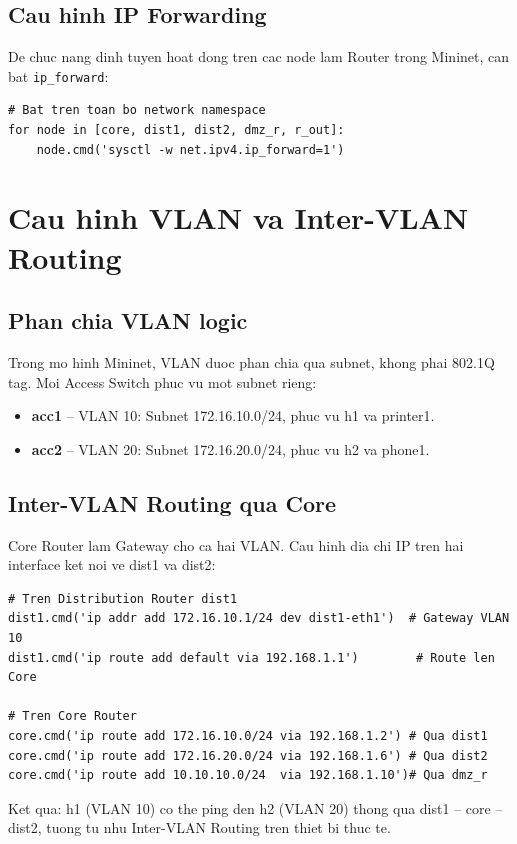 \subsection{Cau hinh IP Forwarding}

De chuc nang dinh tuyen hoat dong tren cac node lam Router trong Mininet, can bat \texttt{ip\_forward}:

\begin{lstlisting}
# Bat tren toan bo network namespace
for node in [core, dist1, dist2, dmz_r, r_out]:
    node.cmd('sysctl -w net.ipv4.ip_forward=1')
\end{lstlisting}

\section{Cau hinh VLAN va Inter-VLAN Routing}

\subsection{Phan chia VLAN logic}

Trong mo hinh Mininet, VLAN duoc phan chia qua subnet, khong phai 802.1Q tag. Moi Access Switch phuc vu mot subnet rieng:

\begin{itemize}
    \item \textbf{acc1} -- VLAN 10: Subnet 172.16.10.0/24, phuc vu h1 va printer1.
    \item \textbf{acc2} -- VLAN 20: Subnet 172.16.20.0/24, phuc vu h2 va phone1.
\end{itemize}

\subsection{Inter-VLAN Routing qua Core}

Core Router lam Gateway cho ca hai VLAN. Cau hinh dia chi IP tren hai interface ket noi ve dist1 va dist2:

\begin{lstlisting}
# Tren Distribution Router dist1
dist1.cmd('ip addr add 172.16.10.1/24 dev dist1-eth1')  # Gateway VLAN 10
dist1.cmd('ip route add default via 192.168.1.1')        # Route len Core

# Tren Core Router
core.cmd('ip route add 172.16.10.0/24 via 192.168.1.2') # Qua dist1
core.cmd('ip route add 172.16.20.0/24 via 192.168.1.6') # Qua dist2
core.cmd('ip route add 10.10.10.0/24  via 192.168.1.10')# Qua dmz_r
\end{lstlisting}

Ket qua: h1 (VLAN 10) co the ping den h2 (VLAN 20) thong qua dist1 -- core -- dist2, tuong tu nhu Inter-VLAN Routing tren thiet bi thuc te.
